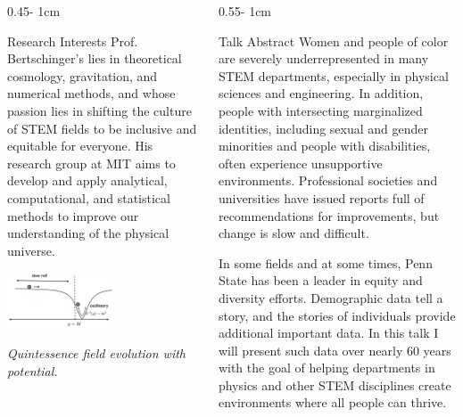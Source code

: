 \documentclass{../psuposter}
\begin{document}
\begin{frame}
\begin{columns}[t, totalwidth=\textwidth]
\begin{column}{0.45\textwidth - 1cm}
    \begin{block}{Research Interests}
        Prof. Bertschinger's lies in theoretical cosmology, gravitation, and numerical methods, and whose passion lies in shifting the culture of STEM fields to be inclusive and equitable for everyone. His research group at MIT aims to develop and apply analytical, computational, and statistical methods to improve our understanding of the physical universe.  
        \begin{center}
	    	\includegraphics[width=0.55\textwidth]{images/research}    		
	    	
	    	\textit{Quintessence field evolution with potential.}
    	\end{center}
    \end{block}
\end{column}
\begin{column}{0.55\textwidth - 1cm}


    \begin{block}{Talk Abstract}
    	Women and people of color are severely underrepresented in many STEM departments, especially in physical sciences and engineering. In addition, people with intersecting marginalized identities, including sexual and gender minorities and people with disabilities, often experience unsupportive environments. Professional societies and universities have issued reports full of recommendations for improvements, but change is slow and difficult.

        In some fields and at some times, Penn State has been a leader in equity and diversity efforts. Demographic data tell a story, and the stories of individuals provide additional important data. In this talk I will present such data over nearly 60 years with the goal of helping departments in physics and other STEM disciplines create environments where all people can thrive.
    \end{block}



\end{column}
\end{columns}
\end{frame}
\end{document}
